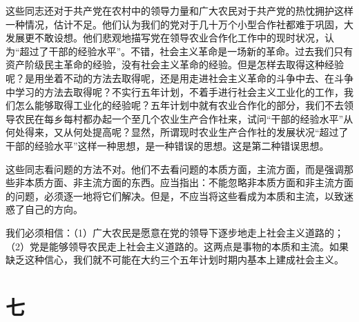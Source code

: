 这些同志还对于共产党在农村中的领导力量和广大农民对于共产党的热忱拥护这样一种情况，估计不足。他们认为我们的党对于几十万个小型合作社都难于巩固，大发展更不敢设想。他们悲观地描写党在领导农业合作化工作中的现时状况，认为“超过了干部的经验水平”。不错，社会主义革命是一场新的革命。过去我们只有资产阶级民主革命的经验，没有社会主义革命的经验。但是怎样去取得这种经验呢？是用坐着不动的方法去取得呢，还是用走进社会主义革命的斗争中去、在斗争中学习的方法去取得呢？不实行五年计划，不着手进行社会主义工业化的工作，我们怎么能够取得工业化的经验呢？五年计划中就有农业合作化的部分，我们不去领导农民在每乡每村都办起一个至几个农业生产合作社来，试问“干部的经验水平”从何处得来，又从何处提高呢？显然，所谓现时农业生产合作社的发展状况“超过了干部的经验水平”这样一种思想，是一种错误的思想。这是第二种错误思想。

这些同志看问题的方法不对。他们不去看问题的本质方面，主流方面，而是强调那些非本质方面、非主流方面的东西。应当指出：不能忽略非本质方面和非主流方面的问题，必须逐一地将它们解决。但是，不应当将这些看成为本质和主流，以致迷惑了自己的方向。

我们必须相信：（1）广大农民是愿意在党的领导下逐步地走上社会主义道路的；（2）党是能够领导农民走上社会主义道路的。这两点是事物的本质和主流。如果缺乏这种信心，我们就不可能在大约三个五年计划时期内基本上建成社会主义。

\section*{七}

